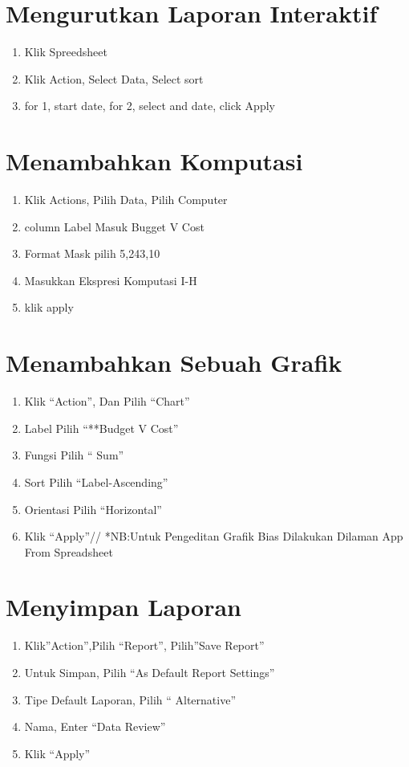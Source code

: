 \documentclass{article}
\begin{document}
\section{Mengurutkan Laporan Interaktif}
\begin{enumerate}
    \item Klik Spreedsheet
    \item Klik Action, Select Data, Select sort
    \item for 1, start date, for 2, select and date, click Apply
\end{enumerate}

\section{ Menambahkan Komputasi}
\begin{enumerate}
    \item Klik Actions, Pilih Data, Pilih Computer
    \item column Label Masuk Bugget V Cost
    \item Format Mask pilih 5,243,10
    \item Masukkan Ekspresi Komputasi I-H
    \item klik apply
\end{enumerate}
\section{ Menambahkan Sebuah Grafik}
\begin{enumerate}
    \item Klik “Action”, Dan Pilih “Chart” 
    \item Label Pilih “**Budget V Cost”
    \item Fungsi Pilih “ Sum”
    \item Sort Pilih “Label-Ascending”
    \item Orientasi Pilih “Horizontal”
    \item Klik “Apply”//
    *NB:Untuk Pengeditan Grafik Bias Dilakukan Dilaman App From Spreadsheet
\end{enumerate}
\section{Menyimpan Laporan}
\begin{enumerate}
    \item Klik”Action”,Pilih “Report”, Pilih”Save Report”
    \item Untuk Simpan, Pilih “As Default Report Settings”
    \item Tipe Default Laporan, Pilih “ Alternative”
    \item Nama, Enter “Data Review”
    \item Klik “Apply”
\end{enumerate}
\end{document}

